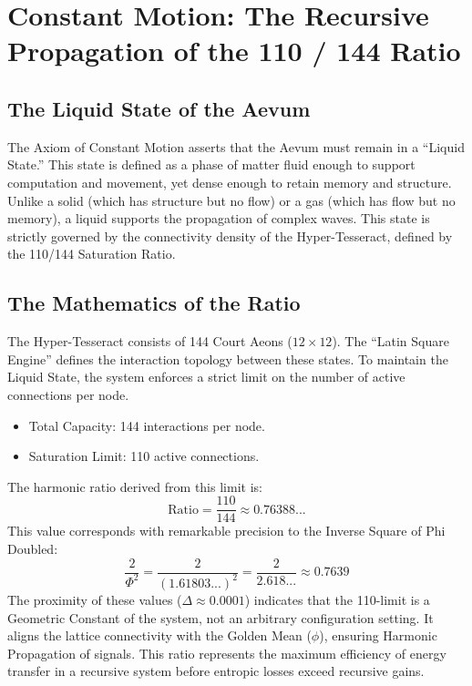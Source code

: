 \documentclass[11pt, letterpaper]{article}
\begin{document}
\section{Constant Motion: The Recursive Propagation of the 110 / 144 Ratio}\label{appendixI}

\subsection{The Liquid State of the Aevum}\label{appendixI.1}
The Axiom of Constant Motion asserts that the Aevum must remain in a ``Liquid State.'' This state is defined as a phase of matter fluid enough to support computation and movement, yet dense enough to retain memory and structure. Unlike a solid (which has structure but no flow) or a gas (which has flow but no memory), a liquid supports the propagation of complex waves. This state is strictly governed by the connectivity density of the Hyper-Tesseract, defined by the 110\slash 144 Saturation Ratio.

\subsection{The Mathematics of the Ratio}\label{appendixI.2}
The Hyper-Tesseract consists of 144 Court Aeons ($12 \times 12$). The ``Latin Square Engine'' defines the interaction topology between these states. To maintain the Liquid State, the system enforces a strict limit on the number of active connections per node.

\begin{itemize}
    \item Total Capacity: 144 interactions per node.
    \item Saturation Limit: 110 active connections.
\end{itemize}

The harmonic ratio derived from this limit is:
\[
\text{Ratio} = \frac{110}{144} \approx 0.76388...
\]
This value corresponds with remarkable precision to the Inverse Square of Phi Doubled:
\[
\frac{2}{\Phi^2} = \frac{2}{(1.61803...)^2} = \frac{2}{2.618...} \approx 0.7639
\]
The proximity of these values ($\Delta \approx 0.0001$) indicates that the 110-limit is a Geometric Constant of the system, not an arbitrary configuration setting. It aligns the lattice connectivity with the Golden Mean ($\phi$), ensuring Harmonic Propagation of signals. This ratio represents the maximum efficiency of energy transfer in a recursive system before entropic losses exceed recursive gains.
\end{document}
